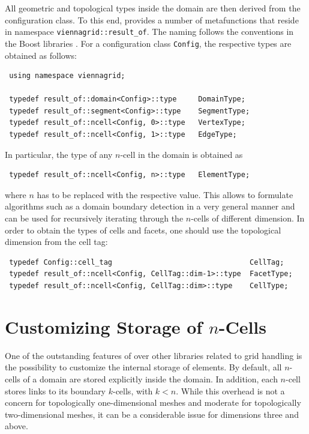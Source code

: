 All geometric and topological types inside the domain are then derived from the configuration class. To this end, {\ViennaGrid} provides
a number of metafunctions that reside in namespace \lstinline|viennagrid::result_of|. The naming follows the conventions in the Boost libraries \cite{boost}.
For a configuration class \lstinline|Config|, the respective types are obtained as follows:
\begin{lstlisting}
 using namespace viennagrid;

 typedef result_of::domain<Config>::type     DomainType;
 typedef result_of::segment<Config>::type    SegmentType;
 typedef result_of::ncell<Config, 0>::type   VertexType;
 typedef result_of::ncell<Config, 1>::type   EdgeType;
\end{lstlisting}
In particular, the type of any $n$-cell in the domain is obtained as
\begin{lstlisting}
 typedef result_of::ncell<Config, n>::type   ElementType;
\end{lstlisting}
where $n$ has to be replaced with the respective value. This allows to formulate algorithms such as a domain boundary detection in a very general manner and can be used for recursively iterating through the $n$-cells of different dimension. In order to obtain the types of cells and facets, one should use the topological dimension from the cell tag:
\begin{lstlisting}
 typedef Config::cell_tag                                CellTag;
 typedef result_of::ncell<Config, CellTag::dim-1>::type  FacetType;
 typedef result_of::ncell<Config, CellTag::dim>::type    CellType;
\end{lstlisting}





\section{Customizing Storage of $n$-Cells} \label{sec:customizing-storage}
One of the outstanding features of {\ViennaGrid} over other libraries related to grid handling is the possibility to customize the internal storage of elements. By default, all $n$-cells of a domain are stored explicitly inside the domain. In addition, each $n$-cell stores links to its boundary $k$-cells, with $k<n$. While this overhead is not a concern for topologically one-dimensional meshes and moderate for topologically two-dimensional meshes, it can be a considerable issue for dimensions three and above. 

